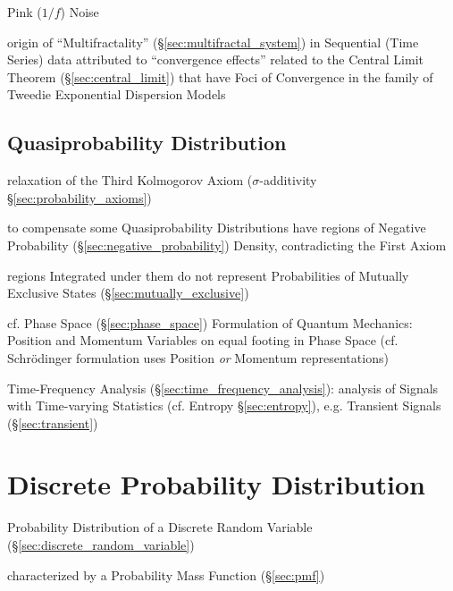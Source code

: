 Pink ($1/f$) Noise

\fist origin of ``Multifractality'' (\S\ref{sec:multifractal_system}) in
Sequential (Time Series) data attributed to ``convergence effects'' related to
the Central Limit Theorem (\S\ref{sec:central_limit}) that have Foci of
Convergence in the family of Tweedie Exponential Dispersion Models



\subsection{Quasiprobability Distribution}
\label{sec:quasiprobability_distribution}

relaxation of the Third Kolmogorov Axiom ($\sigma$-additivity
\S\ref{sec:probability_axioms})

to compensate some Quasiprobability Distributions have regions of Negative
Probability (\S\ref{sec:negative_probability}) Density, contradicting the First
Axiom

regions Integrated under them do not represent Probabilities of Mutually
Exclusive States (\S\ref{sec:mutually_exclusive})

cf. Phase Space (\S\ref{sec:phase_space}) Formulation of Quantum Mechanics:
Position and Momentum Variables on equal footing in Phase Space (cf.
Schr\"odinger formulation uses Position \emph{or} Momentum representations)

\fist Time-Frequency Analysis (\S\ref{sec:time_frequency_analysis}): analysis
of Signals with Time-varying Statistics (cf. Entropy \S\ref{sec:entropy}), e.g.
Transient Signals (\S\ref{sec:transient})



\section{Discrete Probability Distribution}\label{sec:discrete_probability}

Probability Distribution of a Discrete Random Variable
(\S\ref{sec:discrete_random_variable})

characterized by a Probability Mass Function (\S\ref{sec:pmf})

